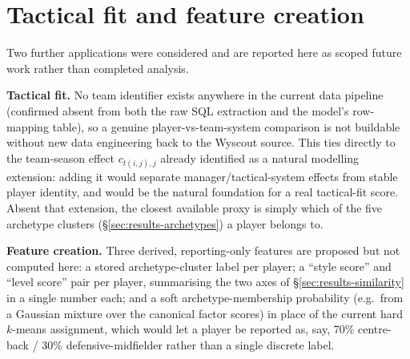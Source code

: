 \section{Tactical fit and feature creation}
\label{sec:results-future}

Two further applications were considered and are reported here as scoped future work rather than completed
analysis.

\textbf{Tactical fit.} No team identifier exists anywhere in the current data pipeline (confirmed absent from
both the raw SQL extraction and the model's row-mapping table), so a genuine player-vs-team-system comparison is
not buildable without new data engineering back to the Wyscout source. This ties directly to the team-season
effect $c_{t(i,j),j}$ already identified as a natural modelling extension: adding it would separate
manager/tactical-system effects from stable player identity, and would be the natural foundation for a real
tactical-fit score. Absent that extension, the closest available proxy is simply which of the five archetype
clusters (\S\ref{sec:results-archetypes}) a player belongs to.

\textbf{Feature creation.} Three derived, reporting-only features are proposed but not computed here: a stored
archetype-cluster label per player; a ``style score'' and ``level score'' pair per player, summarising the two
axes of \S\ref{sec:results-similarity} in a single number each; and a soft archetype-membership probability
(e.g.\ from a Gaussian mixture over the canonical factor scores) in place of the current hard $k$-means
assignment, which would let a player be reported as, say, 70\% centre-back / 30\% defensive-midfielder rather
than a single discrete label.
